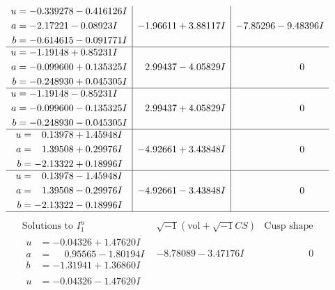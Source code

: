 \documentclass[1p]{elsarticle_modified}
\theoremstyle{definition}
\newcommand{\I}{\sqrt{-1}}
\begin{document}
$$\begin{array}{c|c|c}
\begin{aligned}
u &= -0.339278 - 0.416126 I \\
a &= -2.17221 - 0.08923 I \\
b &= -0.614615 - 0.091771 I\end{aligned}
 & -1.96611 + 3.88117 I & -7.85296 - 9.48396 I \\ \hline\begin{aligned}
u &= -1.19148 + 0.85231 I \\
a &= -0.099600 + 0.135325 I \\
b &= -0.248930 + 0.045305 I\end{aligned}
 & \phantom{-}2.99437 - 4.05829 I & \phantom{-0.000000 } 0 \\ \hline\begin{aligned}
u &= -1.19148 - 0.85231 I \\
a &= -0.099600 - 0.135325 I \\
b &= -0.248930 - 0.045305 I\end{aligned}
 & \phantom{-}2.99437 + 4.05829 I & \phantom{-0.000000 } 0 \\ \hline\begin{aligned}
u &= \phantom{-}0.13978 + 1.45948 I \\
a &= \phantom{-}1.39508 + 0.29976 I \\
b &= -2.13322 + 0.18996 I\end{aligned}
 & -4.92661 + 3.43848 I & \phantom{-0.000000 } 0 \\ \hline\begin{aligned}
u &= \phantom{-}0.13978 - 1.45948 I \\
a &= \phantom{-}1.39508 - 0.29976 I \\
b &= -2.13322 - 0.18996 I\end{aligned}
 & -4.92661 - 3.43848 I & \phantom{-0.000000 } 0\\
 \hline 
 \end{array}$$\newpage$$\begin{array}{c|c|c}  
\text{Solutions to }I^u_{1}& \I (\text{vol} + \sqrt{-1}CS) & \text{Cusp shape}\\
 \hline 
\begin{aligned}
u &= -0.04326 + 1.47620 I \\
a &= \phantom{-}0.95565 - 1.80194 I \\
b &= -1.31941 + 1.36860 I\end{aligned}
 & -8.78089 - 3.47176 I & \phantom{-0.000000 } 0 \\ \hline\begin{aligned}
u &= -0.04326 - 1.47620 I \\

\end{aligned}
\end{array}$$
\end{document}
